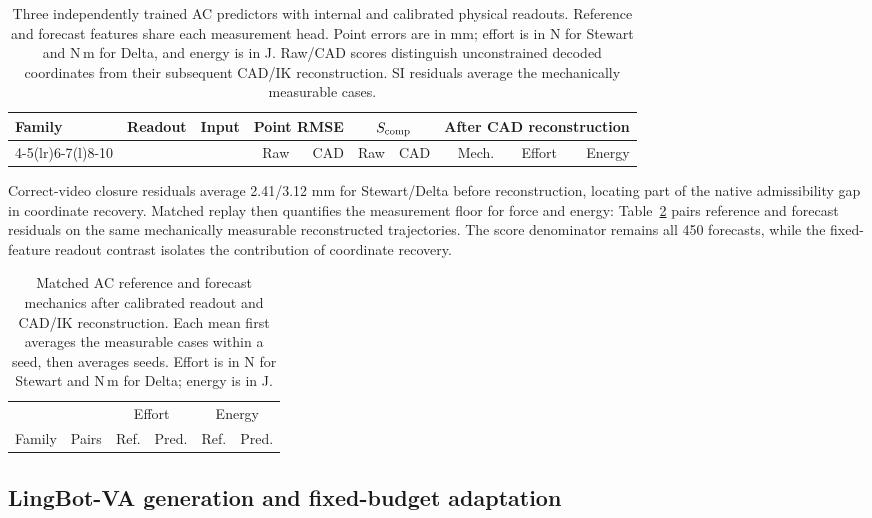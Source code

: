 \documentclass[10pt,twocolumn,letterpaper]{article}
\begin{document}
\begin{table}[t]
\caption{Three independently trained AC predictors with internal and calibrated physical readouts. Reference and forecast features share each measurement head. Point errors are in mm; effort is in N for Stewart and N\,m for Delta, and energy is in J. Raw/CAD scores distinguish unconstrained decoded coordinates from their subsequent CAD/IK reconstruction. SI residuals average the mechanically measurable cases.}
\label{app:ac-readout-table}
\centering\small
\setlength{\tabcolsep}{4pt}
\begin{tabular}{lllrrrrrrr}
\toprule
Family & Readout & Input & \multicolumn{2}{c}{Point RMSE} & \multicolumn{2}{c}{$S_{\rm comp}$} & \multicolumn{3}{c}{After CAD reconstruction}\\
\cmidrule(lr){4-5}\cmidrule(lr){6-7}\cmidrule(l){8-10}
& & & Raw & CAD & Raw & CAD & Mech. & Effort & Energy\\
\midrule

\bottomrule
\end{tabular}
\end{table}

Correct-video closure residuals average 2.41/3.12 mm for Stewart/Delta before reconstruction, locating part of the native admissibility gap in coordinate recovery. Matched replay then quantifies the measurement floor for force and energy: Table~\ref{app:ac-reference} pairs reference and forecast residuals on the same mechanically measurable reconstructed trajectories. The score denominator remains all 450 forecasts, while the fixed-feature readout contrast isolates the contribution of coordinate recovery.

\begin{table}[t]
\caption{Matched AC reference and forecast mechanics after calibrated readout and CAD/IK reconstruction. Each mean first averages the measurable cases within a seed, then averages seeds. Effort is in N for Stewart and N\,m for Delta; energy is in J.}
\label{app:ac-reference}
\centering\footnotesize
\setlength{\tabcolsep}{3pt}
\begin{tabular}{llrrrr}
\toprule
& & \multicolumn{2}{c}{Effort} & \multicolumn{2}{c}{Energy}\\
Family & Pairs & Ref. & Pred. & Ref. & Pred.\\
\midrule

\bottomrule
\end{tabular}
\end{table}

\subsection{LingBot-VA generation and fixed-budget adaptation}
\label{app:lingbot}
\end{document}
